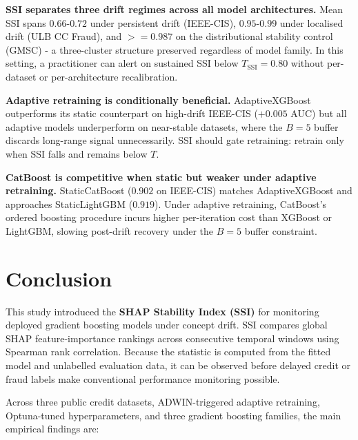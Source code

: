 \documentclass[pdflatex,sn-mathphys-num]{sn-jnl}
\theoremstyle{thmstyleone}
\theoremstyle{thmstyletwo}
\theoremstyle{thmstylethree}
\begin{document}
\textbf{SSI separates three drift regimes across all model
architectures.}
Mean SSI spans $0.66$-$0.72$ under persistent drift (IEEE-CIS), $0.95$-$0.99$
under localised drift (ULB CC Fraud), and ${\mathrel{>=}}0.987$ on the distributional
stability control (GMSC) - a three-cluster structure preserved regardless of
model family. In this setting, a practitioner can alert on sustained SSI below
$T_{\mathrm{SSI}} = 0.80$ without per-dataset or per-architecture
recalibration.

\textbf{Adaptive retraining is conditionally beneficial.}
AdaptiveXGBoost outperforms its static counterpart on high-drift IEEE-CIS
($+0.005$ AUC) but all adaptive models underperform on near-stable datasets,
where the $B=5$ buffer discards long-range signal unnecessarily. SSI should
gate retraining: retrain only when SSI falls and remains below $T$.

\textbf{CatBoost is competitive when static but weaker under adaptive
retraining.} StaticCatBoost ($0.902$ on IEEE-CIS) matches AdaptiveXGBoost
and approaches StaticLightGBM ($0.919$). Under adaptive retraining,
CatBoost's ordered boosting procedure incurs higher per-iteration cost than
XGBoost or LightGBM, slowing post-drift recovery under the $B=5$ buffer
constraint.


\section{Conclusion}\label{sec:conclusion}

This study introduced the \textbf{SHAP Stability Index (SSI)} for monitoring
deployed gradient boosting models under concept drift. SSI compares global SHAP
feature-importance rankings across consecutive temporal windows using Spearman
rank correlation. Because the statistic is computed from the fitted model and
unlabelled evaluation data, it can be observed before delayed credit or fraud
labels make conventional performance monitoring possible.

Across three public credit datasets, ADWIN-triggered adaptive retraining,
Optuna-tuned hyperparameters, and three gradient boosting families, the main
empirical findings are:
\end{document}

